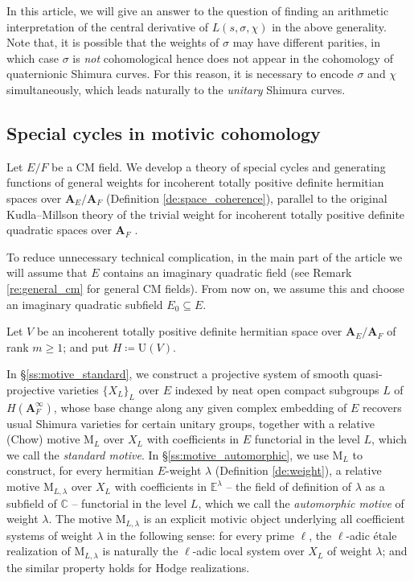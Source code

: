 \documentclass[12pt]{amsart}
\numberwithin{equation}{section}
\theoremstyle{plain}
\theoremstyle{definition}
\theoremstyle{remark}
\renewcommand{\b}[1]{\mathbf{#1}}
\renewcommand{\d}[1]{\mathbb{#1}}
\renewcommand{\r}[1]{\mathrm{#1}}
\renewcommand{\(}{\left(}
\renewcommand{\)}{\right)}
\renewcommand{\geq}{\geqslant}
\newcommand{\bA}{\b A}
\newcommand{\dC}{\d C}
\newcommand{\dE}{\d E}
\newcommand{\rM}{\r M}
\newcommand{\rU}{\r U}
\begin{document}
In this article, we will give an answer to the question of finding an arithmetic interpretation of the central derivative of $L(s,\sigma,\chi)$ in the above generality. Note that, it is possible that the weights of $\sigma$ may have different parities, in which case $\sigma$ is \emph{not} cohomological hence does not appear in the cohomology of quaternionic Shimura curves. For this reason, it is necessary to encode $\sigma$ and $\chi$ simultaneously, which leads naturally to the \emph{unitary} Shimura curves.


\subsection{Special cycles in motivic cohomology}


Let $E/F$ be a CM field. We develop a theory of special cycles and generating functions of general weights for incoherent totally positive definite hermitian spaces over $\bA_E/\bA_F$ (Definition \ref{de:space_coherence}), parallel to the original Kudla--Millson theory of the trivial weight for incoherent totally positive definite quadratic spaces over $\bA_F$ \cite{KM90}.

To reduce unnecessary technical complication, in the main part of the article we will assume that $E$ contains an imaginary quadratic field (see Remark \ref{re:general_cm} for general CM fields). From now on, we assume this and choose an imaginary quadratic subfield $E_0\subseteq E$.

Let $V$ be an incoherent totally positive definite hermitian space over $\bA_E/\bA_F$ of rank $m\geq 1$; and put $H\coloneqq\rU(V)$.

In \S\ref{ss:motive_standard}, we construct a projective system of smooth quasi-projective varieties $\{X_L\}_L$ over $E$ indexed by neat open compact subgroups $L$ of $H(\bA_F^\infty)$, whose base change along any given complex embedding of $E$ recovers usual Shimura varieties for certain unitary groups, together with a relative (Chow) motive $\rM_L$ over $X_L$ with coefficients in $E$ functorial in the level $L$, which we call the \emph{standard motive}. In \S\ref{ss:motive_automorphic}, we use $\rM_L$ to construct, for every hermitian $E$-weight $\lambda$ (Definition \ref{de:weight}), a relative motive $\rM_{L,\lambda}$ over $X_L$ with coefficients in $\dE^\lambda$ -- the field of definition of $\lambda$ as a subfield of $\dC$ -- functorial in the level $L$, which we call the \emph{automorphic motive} of weight $\lambda$. The motive $\rM_{L,\lambda}$ is an explicit motivic object underlying all coefficient systems of weight $\lambda$ in the following sense: for every prime $\ell$, the $\ell$-adic \'{e}tale realization of $\rM_{L,\lambda}$ is naturally the $\ell$-adic local system over $X_L$ of weight $\lambda$; and the similar property holds for Hodge realizations.
\end{document}
